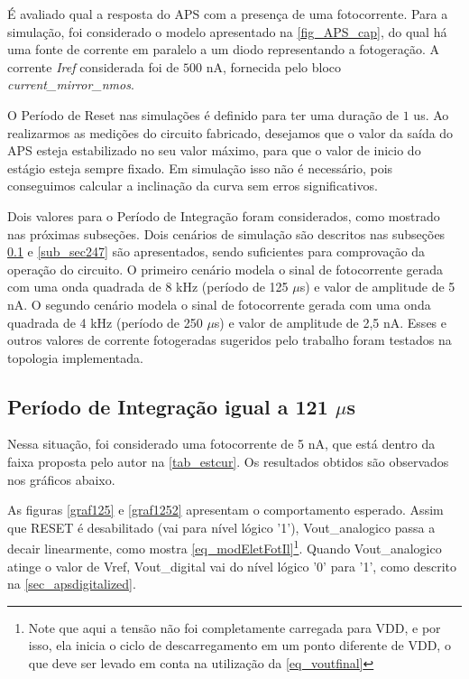 É avaliado qual a resposta do APS com a presença de uma fotocorrente. Para a simulação, foi considerado o modelo apresentado na \autoref{fig_APS_cap}, do qual há uma fonte de corrente em paralelo a um diodo representando a fotogeração. A corrente \textit{Iref} considerada foi de $500$ nA, fornecida pelo bloco \textit{current\_mirror\_nmos}.

O Período de Reset nas simulações é definido para ter uma duração de $1$ us. Ao realizarmos as medições do circuito fabricado, desejamos que o valor da saída do APS esteja estabilizado no seu valor máximo, para que o valor de inicio do estágio esteja sempre fixado. Em simulação isso não é necessário, pois conseguimos calcular a inclinação da curva sem erros significativos.

Dois valores para o Período de Integração foram considerados, como mostrado nas próximas subseções.
Dois cenários de simulação são descritos nas subseções \ref{sub_sec121} e \ref{sub_sec247} são apresentados, sendo suficientes para comprovação da operação do circuito. O primeiro cenário modela o sinal de fotocorrente gerada com uma onda quadrada de 8 kHz (período de 125 $\mu$s) e valor de amplitude de 5 nA. O segundo cenário modela o sinal de fotocorrente gerada com uma onda quadrada de 4 kHz (período de 250 $\mu$s) e valor de amplitude de 2,5 nA. Esses e outros valores de corrente fotogeradas sugeridos pelo trabalho \cite{LidianeCampos} foram testados na topologia implementada.

\subsection{Período de Integração igual a 121 $\mu$s}
\label{sub_sec121}

Nessa situação, foi considerado uma fotocorrente de 5 nA, que está dentro da faixa proposta pelo autor na \autoref{tab_estcur}. Os resultados obtidos são observados nos gráficos abaixo.

As figuras \ref{graf125} e \ref{graf1252} apresentam o comportamento esperado. Assim que RESET é desabilitado (vai para nível lógico '1'), Vout\_analogico passa a decair linearmente, como mostra \autoref{eq_modEletFotIl}\footnote{Note que aqui a tensão não foi completamente carregada para VDD, e por isso, ela inicia o ciclo de descarregamento em um ponto diferente de VDD, o que deve ser levado em conta na utilização da \autoref{eq_voutfinal}}. Quando Vout\_analogico atinge o valor de Vref, Vout\_digital vai do nível lógico '0' para '1', como descrito na \autoref{sec_apsdigitalized}.

